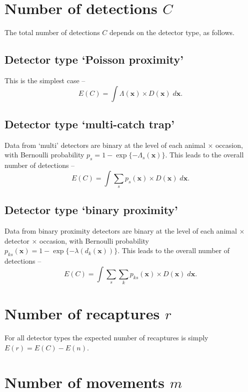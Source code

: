 \documentclass[
]{book}
\begin{document}
\section{\texorpdfstring{Number of detections \(C\)}{Number of detections C}}\label{number-of-detections-c}

The total number of detections \(C\) depends on the detector type, as follows.

\subsection{Detector type `Poisson proximity'}\label{detector-type-poisson-proximity}

This is the simplest case --
\[E(C) = \int \Lambda(\mathbf{x}) \times D(\mathbf{x}) \; d\mathbf{x}.\]

\subsection{Detector type `multi-catch trap'}\label{detector-type-multi-catch-trap}

Data from `multi' detectors are binary at the level of each animal \(\times\) occasion, with Bernoulli probability \(p_s = 1 - \exp\{- \Lambda_s(\mathbf{x})\}\). This leads to the overall number of detections -- \[E(C) = \int \sum_s p_s(\mathbf{x}) \times D(\mathbf{x}) \; d \mathbf{x}.\]

\subsection{Detector type `binary proximity'}\label{detector-type-binary-proximity}

Data from binary proximity detectors are binary at the level of each animal \(\times\) detector \(\times\) occasion, with Bernoulli probability \(p_{ks}(\mathbf{x}) = 1 - \exp\{- \lambda(d_k(\mathbf{x}))\}\). This leads to the overall number of detections -- \[E(C) = \int \sum_s \sum_k p_{ks}(\mathbf{x}) \times D(\mathbf{x}) \; d\mathbf{x}.\]

\section{\texorpdfstring{Number of recaptures \(r\)}{Number of recaptures r}}\label{number-of-recaptures-r}

For all detector types the expected number of recaptures is simply \(E(r) = E(C) - E(n).\)

\section{\texorpdfstring{Number of movements \(m\)}{Number of movements m}}\label{number-of-movements-m}
\end{document}
